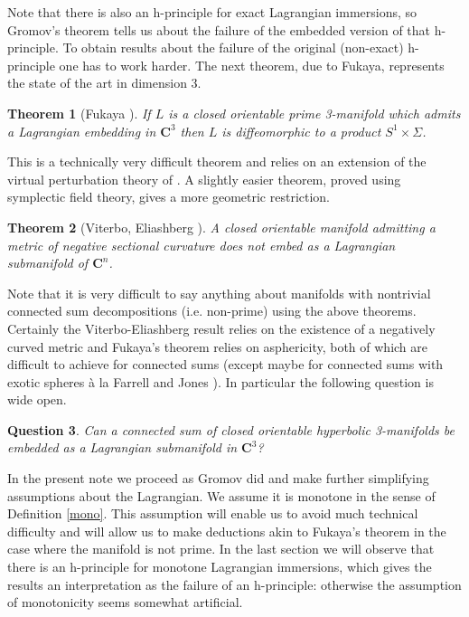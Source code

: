 \documentclass{amsart}
\newcommand{\CC}{\mathbf{C}}
\newtheorem{thm}{Theorem}
\newtheorem{qun}[thm]{Question}
\begin{document}
Note that there is also an h-principle for exact Lagrangian immersions, so Gromov's theorem tells us about the failure of the embedded version of that h-principle. To obtain results about the failure of the original (non-exact) h-principle one has to work harder. The next theorem, due to Fukaya, represents the state of the art in dimension 3.
\begin{thm}[Fukaya \cite{Fuk}]\label{fuk}
If $L$ is a closed orientable prime 3-manifold which admits a Lagrangian embedding in $\CC^3$ then $L$ is diffeomorphic to a product $S^1\times\Sigma$.
\end{thm}
This is a technically very difficult theorem and relies on an extension of the virtual perturbation theory of \cite{FOOO}. A slightly easier theorem, proved using symplectic field theory, gives a more geometric restriction.
\begin{thm}[Viterbo, Eliashberg \cite{SFT}]\label{VitEl}
A closed orientable manifold admitting a metric of negative sectional curvature does not embed as a Lagrangian submanifold of $\CC^n$.
\end{thm}
Note that it is very difficult to say anything about manifolds with nontrivial connected sum decompositions (i.e. non-prime) using the above theorems. Certainly the Viterbo-Eliashberg result relies on the existence of a negatively curved metric and Fukaya's theorem relies on asphericity, both of which are difficult to achieve for connected sums (except maybe for connected sums with exotic spheres \`{a} la Farrell and Jones \cite{FJ}). In particular the following question is wide open.
\begin{qun}
Can a connected sum of closed orientable hyperbolic 3-manifolds be embedded as a Lagrangian submanifold in $\CC^3$?
\end{qun}

In the present note we proceed as Gromov did and make further simplifying assumptions about the Lagrangian. We assume it is monotone in the sense of Definition \ref{mono}. This assumption will enable us to avoid much technical difficulty and will allow us to make deductions akin to Fukaya's theorem in the case where the manifold is not prime. In the last section we will observe that there is an h-principle for monotone Lagrangian immersions, which gives the results an interpretation as the failure of an h-principle: otherwise the assumption of monotonicity seems somewhat artificial.
\end{document}
